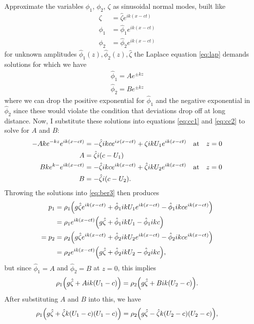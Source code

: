 \documentclass[10pt]{article}
\begin{document}
Approximate the variables $\phi_1$, $\phi_2$, $\zeta$ as sinusoidal normal modes, built like
\begin{align}
    \zeta & = \hat\zeta e^{ik(x-ct)} \\
    \phi_1 & = \hat\phi_1 e^{ik(x-ct)} \\
    \phi_2 & = \hat\phi_2 e^{ik(x-ct)}
\end{align}
for unknown amplitudes $\hat\phi_1(z), \hat\phi_2(z), \hat\zeta$ the Laplace equation \eqref{eq:lap} demands solutions for which we have
\begin{align}
    \hat\phi_1 = Ae^{\pm kz} \\
    \hat\phi_2 = Be^{\pm kz}
\end{align}
where we can drop the positive exponential for $\hat\phi_1$ and the negative exponential in $\hat\phi_2$ since these would violate the condition that deviations drop off at long distance. Now, I substitute these solutions into equations \eqref{eq:cc1} and \eqref{eq:cc2} to solve for $A$ and $B$:
\begin{align}
    -Ake^{-kz}e^{ik(x-ct)} & = -\hat\zeta ikce^{ix(x-ct)} + \zeta ikU_1e^{ik(x-ct)} \qq{at} z = 0 \nonumber \\
    A & = \hat\zeta i(c-U_1) \\
    Bke^{k-}e^{ik(x-ct)} & = -\hat\zeta ikce^{ik(x-ct)} + \hat\zeta ikU_2e^{ik(x-ct)} \qq{at} z = 0 \nonumber \\
    B & = -\hat\zeta i(c - U_2).
\end{align}
Throwing the solutions into \eqref{eq:ber3} then produces
\begin{align}
    p_1 & = \rho_1\qty(g\hat\zeta e^{ik(x-ct)} + \hat\phi_1ikU_1e^{ik(x-ct)} - \hat\phi_1ikce^{ik(x-ct)}) \\
        & = \rho_1e^{ik(x-ct)}\qty(g\hat\zeta + \hat\phi_1ikU_1 - \hat\phi_1ikc) \nonumber \\
    = p_2 & = \rho_2\qty(g\hat\zeta e^{ik(x-ct)} + \hat\phi_2ikU_2e^{ik(x-ct)} - \hat\phi_2ikce^{ik(x-ct)}) \nonumber \\
          & = \rho_2e^{ik(x-ct)}\qty(g\hat\zeta + \hat\phi_2ikU_2 - \hat\phi_2ikc),
\end{align}
but since $\hat\phi_1 = A$ and $\hat\phi_2 = B$ at $z = 0$, this implies
\begin{align}
    \rho_1\qty(g\hat\zeta + Aik(U_1 - c)) = \rho_2\qty(g\hat\zeta + Bik(U_2 - c)).
\end{align}
After substituting $A$ and $B$ into this, we have
\begin{align}
    \rho_1\qty(g\hat\zeta + \hat\zeta k(U_1 - c)(U_1 - c)) = \rho_2\qty(g\hat\zeta - \hat\zeta k(U_2 - c)(U_2 - c)),
\end{align}
\end{document}
